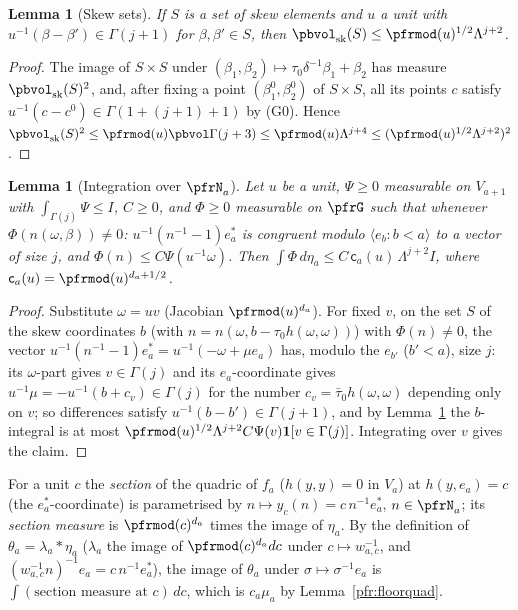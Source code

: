 \documentclass[10pt]{amsart}
\newtheorem{lemma}[theorem]{Lemma}
\theoremstyle{definition}
\theoremstyle{remark}
\begin{document}
\begin{lemma}[Skew sets]\label{pfr:skew}
If $S$ is a set of skew elements and $u$ a unit with $u^{-1}(\beta-\beta')\in\Gamma(j+1)$ for $\beta,\beta'\in S$, then
$\pbvol_{\rm sk}(S)\le\pfrmod(u)^{1/2}\Lambda^{j+2}$.
\end{lemma}
\begin{proof}
The image of $S\times S$ under $(\beta_1,\beta_2)\mapsto\tau_0\delta^{-1}\beta_1+\beta_2$ has measure $\pbvol_{\rm sk}(S)^2$, and,
after fixing a point $(\beta^0_1,\beta^0_2)$ of $S\times S$, all its points $c$ satisfy
$u^{-1}(c-c^0)\in\Gamma(1+(j+1)+1)$ by (G0). Hence $\pbvol_{\rm sk}(S)^2\le\pfrmod(u)\pbvol\Gamma(j+3)\le\pfrmod(u)\Lambda^{j+4}
\le(\pfrmod(u)^{1/2}\Lambda^{j+2})^2$.
\end{proof}

\begin{lemma}[Integration over $\pfrN_a$]\label{pfr:heis}
Let $u$ be a unit, $\Psi\ge0$ measurable on $V_{a+1}$ with $\int_{\Gamma(j)}\Psi\le I$, $C\ge0$, and $\Phi\ge0$
measurable on $\pfrG$ such that whenever $\Phi(n(\omega,\beta))\ne0$: $u^{-1}(n^{-1}-1)e_a^*$ is congruent modulo
$\langle e_b:b<a\rangle$ to a vector of size $j$, and $\Phi(n)\le C\Psi(u^{-1}\omega)$. Then
$\int\Phi\,d\eta_a\le C\,\mathsf c_a(u)\,\Lambda^{j+2}I$, where $\mathsf c_a(u)=\pfrmod(u)^{d_a+1/2}$.
\end{lemma}
\begin{proof}
Substitute $\omega=uv$ (Jacobian $\pfrmod(u)^{d_a}$). For fixed $v$, on the set $S$ of the skew coordinates $b$
(with $n=n(\omega,b-\tau_0h(\omega,\omega))$) with $\Phi(n)\ne0$, the vector $u^{-1}(n^{-1}-1)e_a^*=u^{-1}(-\omega+\mu e_a)$ has,
modulo the $e_{b'}$ ($b'<a$), size $j$: its $\omega$-part gives $v\in\Gamma(j)$ and its $e_a$-coordinate gives
$u^{-1}\mu=-u^{-1}(b+c_v)\in\Gamma(j)$ for the number $c_v=\bar\tau_0h(\omega,\omega)$ depending only on $v$; so differences
satisfy $u^{-1}(b-b')\in\Gamma(j+1)$, and by Lemma~\ref{pfr:skew} the $b$-integral is at most $\pfrmod(u)^{1/2}\Lambda^{j+2}C\Psi(v)\mathbf 1[v\in\Gamma(j)]$. Integrating over $v$ gives the
claim.
\end{proof}

For a unit $c$ the \emph{section} of the quadric of $f_a$ ($h(y,y)=0$ in $V_a$) at $h(y,e_a)=c$ (the
$e_a^*$-coordinate) is parametrised by
$n\mapsto y_c(n)=c\,n^{-1}e_a^*$, $n\in\pfrN_a$; its \emph{section measure} is $\pfrmod(c)^{d_a}$ times the image of
$\eta_a$. By the definition of $\theta_a=\lambda_a*\eta_a$ ($\lambda_a$ the image of $\pfrmod(c)^{d_a}dc$ under
$c\mapsto w_{a,c}^{-1}$, and $(w_{a,c}^{-1}n)^{-1}e_a=c\,n^{-1}e_a^*$), the image of $\theta_a$ under $\sigma\mapsto\sigma^{-1}e_a$ is
$\int(\text{section measure at }c)\,dc$, which is $c_a\mu_a$ by Lemma~\ref{pfr:floorquad}.
\end{document}

